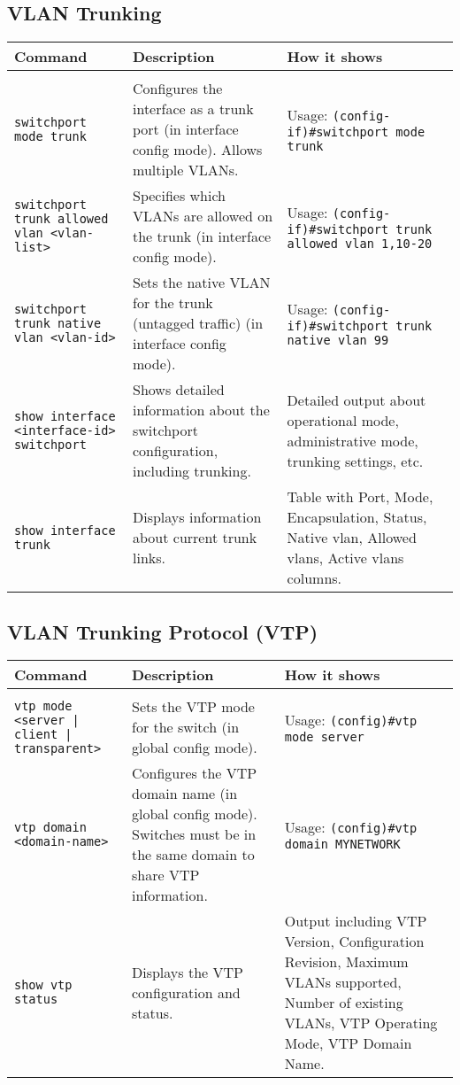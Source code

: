 \documentclass{article}
\begin{document}
\subsection{VLAN Trunking}
\begin{longtable}{>{\raggedright\arraybackslash}p{4cm}|>{\raggedright\arraybackslash}p{7cm}|>{\raggedright\arraybackslash}p{5cm}}
\toprule
\textbf{Command} & \textbf{Description} & \textbf{How it shows} \\
\midrule
\endhead
\midrule
\multicolumn{3}{r}{{Continued on next page}} \\
\midrule
\endfoot
\bottomrule
\endlastfoot
\texttt{switchport mode trunk} & Configures the interface as a trunk port (in interface config mode). Allows multiple VLANs. & Usage: \texttt{(config-if)\#switchport mode trunk} \\
\hline
\texttt{switchport trunk allowed vlan <vlan-list>} & Specifies which VLANs are allowed on the trunk (in interface config mode). & Usage: \texttt{(config-if)\#switchport trunk allowed vlan 1,10-20} \\
\hline
\texttt{switchport trunk native vlan <vlan-id>} & Sets the native VLAN for the trunk (untagged traffic) (in interface config mode). & Usage: \texttt{(config-if)\#switchport trunk native vlan 99} \\
\hline
\texttt{show interface <interface-id> switchport} & Shows detailed information about the switchport configuration, including trunking. & Detailed output about operational mode, administrative mode, trunking settings, etc. \\
\hline
\texttt{show interface trunk} & Displays information about current trunk links. & Table with Port, Mode, Encapsulation, Status, Native vlan, Allowed vlans, Active vlans columns. \\
\end{longtable}

\subsection{VLAN Trunking Protocol (VTP)}
\begin{longtable}{>{\raggedright\arraybackslash}p{4cm}|>{\raggedright\arraybackslash}p{7cm}|>{\raggedright\arraybackslash}p{5cm}}
\toprule
\textbf{Command} & \textbf{Description} & \textbf{How it shows} \\
\midrule
\endhead
\midrule
\multicolumn{3}{r}{{Continued on next page}} \\
\midrule
\endfoot
\bottomrule
\endlastfoot
\texttt{vtp mode <server | client | transparent>} & Sets the VTP mode for the switch (in global config mode). & Usage: \texttt{(config)\#vtp mode server} \\
\hline
\texttt{vtp domain <domain-name>} & Configures the VTP domain name (in global config mode). Switches must be in the same domain to share VTP information. & Usage: \texttt{(config)\#vtp domain MYNETWORK} \\
\hline
\texttt{show vtp status} & Displays the VTP configuration and status. & Output including VTP Version, Configuration Revision, Maximum VLANs supported, Number of existing VLANs, VTP Operating Mode, VTP Domain Name. \\
\end{longtable}
\end{document}
